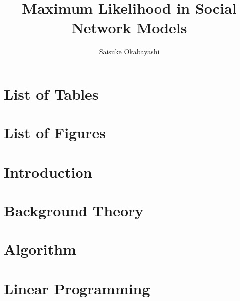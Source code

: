 \documentclass[oneside]{myumnStatThesis}
\author{Saisuke Okabayashi}
\title{Maximum Likelihood in 
 Social Network Models}
\begin{document}
\maketitlepage %

\begin{abstract}

\end{abstract}

\tableofcontents %

\newpage
\chapter*{List of Tables}
{\def\chapter*#1{}
\listoftables}

\newpage
\chapter*{List of Figures}
{\def\chapter*#1{}
\listoffigures}


\mainmatter
\onehalfspacing %
\small  %

\chapter{Introduction}


\chapter{Background Theory}\label{Chapter:Background}


\chapter{Algorithm}
 

\chapter{Linear Programming} \label{Chapter:Linear programming}
 
\end{document}
